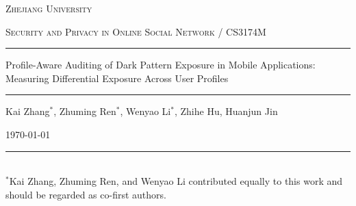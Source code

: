 \documentclass[math]{amznotes}
\begin{document}

\begin{titlepage}
    \centering
    \vspace*{1.6cm}

    {\scshape\LARGE Zhejiang University \par}
    \vspace{0.7cm}
    {\scshape\Large Security and Privacy in Online Social Network / CS3174M \par}
    \vspace{1.0cm}

    \rule{\linewidth}{0.8pt}
    \vspace{0.45cm}

    {\LARGE \bfseries
    \parbox{0.92\linewidth}{
        \centering
        Profile-Aware Auditing of Dark Pattern Exposure in Mobile Applications:\\
        Measuring Differential Exposure Across User Profiles
    }
    \par}

    \vspace{0.45cm}
    \rule{\linewidth}{0.8pt}

    \vspace{1.2cm}

    {\Large Kai Zhang$^{*}$, Zhuming Ren$^{*}$, Wenyao Li$^{*}$, Zhihe Hu, Huanjun Jin\par}

    \vfill

    {\large \today\par}

    \vspace{1.2cm}

    \begin{flushleft}
        \rule{0.36\linewidth}{0.4pt}\\[-0.1cm]
        {\small
        $^{*}$Kai Zhang, Zhuming Ren, and Wenyao Li contributed equally to this work
        and should be regarded as co-first authors.
        }
    \end{flushleft}

\end{titlepage}

\newpage

\tableofcontents
\newpage



















\FloatBarrier






\end{document}
